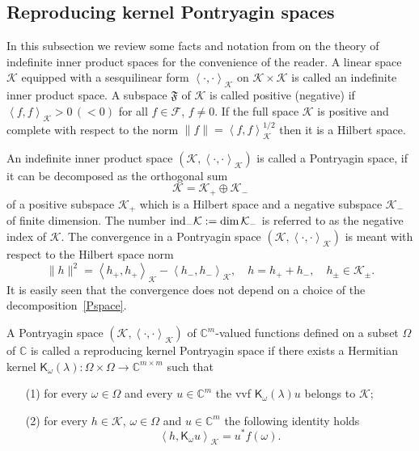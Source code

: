 \documentclass[12pt,twoside,a4paper]{amsart}
\theoremstyle{definition}
\numberwithin{equation}{section}
\begin{document}
\subsection{Reproducing kernel Pontryagin spaces}
In this subsection we review some facts and notation from \cite{AI,Bo} on
the theory of
indefinite inner product spaces for the convenience of the reader. A linear
space ${{\mathcal K}}$
equipped with a sesquilinear form $\left<\cdot,\cdot\right>_{{\mathcal K}}$ on
${{\mathcal K}}\times{{\mathcal K}}$ is
called an indefinite inner product space. A subspace ${{\mathfrak F}}$ of ${{\mathcal K}}$ is
called positive
(negative) if $\left<f,f\right>_{{\mathcal K}}>0\,(<0)$ for all $f\in{{\mathcal F}}$, $f\ne 0$. If
the full
space ${{\mathcal K}}$ is positive and complete with respect to the norm
$\|f\|=\left<f,f\right>_{{\mathcal K}}^{1/2}$ then it is a Hilbert space.

An indefinite inner product space $({{\mathcal K}},\left<\cdot,\cdot\right>_{{\mathcal K}})$ is
called a Pontryagin space, if it can be decomposed as the
orthogonal sum
\begin{equation}\label{Pspace}
    {{\mathcal K}}={{\mathcal K}}_+\oplus{{\mathcal K}}_-
\end{equation}
of a positive subspace ${{\mathcal K}}_+$ which is a Hilbert space and a
negative subspace ${{\mathcal K}}_-$ of finite dimension. The number
$\mbox{ind}_-{{\mathcal K}} :={{\rm dim\,}}{{\mathcal K}}_-$ is referred to as the negative index
of ${{\mathcal K}}$. The convergence in a Pontryagin space
$({{\mathcal K}},\left<\cdot,\cdot\right>_{{\mathcal K}})$ is meant with respect to the
Hilbert space norm
\begin{equation}\label{Pnorm}
    \|h\|^2=\left<h_+,h_+\right>_{{\mathcal K}}-\left<h_-,h_-\right>_{{\mathcal K}},\quad
    h=h_++h_-,\quad h_\pm\in{{\mathcal K}}_\pm.
\end{equation}
It is easily seen that the convergence does not depend on a choice of
the decomposition~\eqref{Pspace}.

A Pontryagin space $({{\mathcal K}},\left<\cdot,\cdot\right>_{{\mathcal K}})$ of
${{\mathbb C}}^m$-valued functions defined on a subset $\Omega$ of ${{\mathbb C}}$ is called
a reproducing kernel Pontryagin space if there exists a
Hermitian kernel ${\mathsf
K}_\omega(\lambda):\Omega\times\Omega\to{{\mathbb C}}^{m\times m}$ such that
\begin{enumerate}
\item[\rm(1)] for every $\omega\in\Omega$ and every $u\in{{\mathbb C}}^m$ the vvf
${\mathsf K}_\omega
(\lambda)u$ belongs to ${{\mathcal K}}$; \vskip 6pt
\item[\rm(2)] for every $h\in{{\mathcal K}}$, $\omega\in\Omega$ and $u\in{{\mathbb C}}^m$ the
following identity holds
\begin{equation}\label{RKprop}
    \left<h,{\mathsf K}_\omega u\right>_{{\mathcal K}}=u^*f(\omega).
\end{equation}
\end{enumerate}
\end{document}
